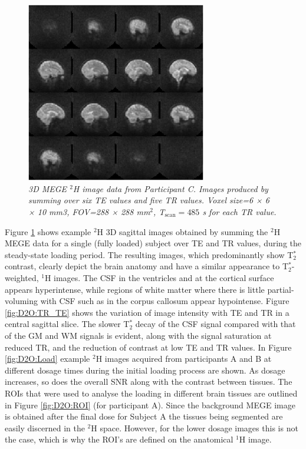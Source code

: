 \begin{figure}[H]
    \centering
    \includegraphics[width=0.7\textwidth]{Figures/D2O/Sag_Full.png}
    \caption{\textit{3D MEGE $^2$H image data from Participant C. Images produced by summing over six TE values and five TR values. Voxel size=6 × 6 × 10 mm3, FOV=288 × 288 mm$^2$, T$_\textrm{scan}=485$ s for each TR value.}}
    \label{fig:D2O:Sag_Full}
\end{figure}

Figure \ref{fig:D2O:Sag_Full} shows example $^2$H 3D sagittal images obtained by summing the $^2$H \ac{MEGE} data for a single (fully loaded) subject over \ac{TE} and \ac{TR} values, during the steady-state loading period. The resulting images, which predominantly show T$_2^*$ contrast, clearly depict the brain anatomy and have a similar appearance to T$_2^*$-weighted, $^1$H images. The \ac{CSF} in the ventricles and at the cortical surface appears hyperintense, while regions of white matter where there is little partial-voluming with \ac{CSF} such as in the corpus callosum appear hypointense. Figure \ref{fig:D2O:TR_TE} shows the variation of image intensity with TE and TR in a central sagittal slice. The slower T$_2^*$ decay of the CSF signal compared with that of the \ac{GM} and \ac{WM} signals is evident, along with the signal saturation at reduced \ac{TR}, and the reduction of contrast at low \ac{TE} and \ac{TR} values. In Figure \ref{fig:D2O:Load} example $^2$H images acquired from participants A and B at different dosage times during the initial loading process are shown. As dosage increases, so does the overall \ac{SNR} along with the contrast between tissues. The \ac{ROI}s that were used to analyse the loading in different brain tissues are outlined in Figure \ref{fig:D2O:ROI} (for participant A). Since the background \ac{MEGE} image is obtained after the final dose for Subject A the tissues being segmented are easily discerned in the $^2$H space. However, for the lower dosage images this is not the case, which is why the \ac{ROI}’s are defined on the anatomical $^1$H image. 

